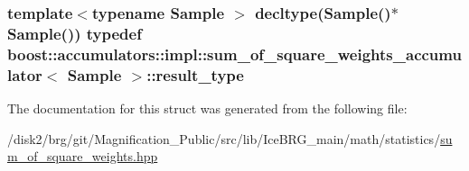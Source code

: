 \subsubsection[{result\+\_\+type}]{\setlength{\rightskip}{0pt plus 5cm}template$<$typename Sample $>$ decltype(Sample()$\ast$Sample()) typedef {\bf boost\+::accumulators\+::impl\+::sum\+\_\+of\+\_\+square\+\_\+weights\+\_\+accumulator}$<$ Sample $>$\+::result\+\_\+type}\label{structboost_1_1accumulators_1_1impl_1_1sum__of__square__weights__accumulator_ab0a1d0065251cac2102de3263086cb09}


The documentation for this struct was generated from the following file\+:\begin{DoxyCompactItemize}
\item 
/disk2/brg/git/\+Magnification\+\_\+\+Public/src/lib/\+Ice\+B\+R\+G\+\_\+main/math/statistics/\hyperlink{sum__of__square__weights_8hpp}{sum\+\_\+of\+\_\+square\+\_\+weights.\+hpp}\end{DoxyCompactItemize}
